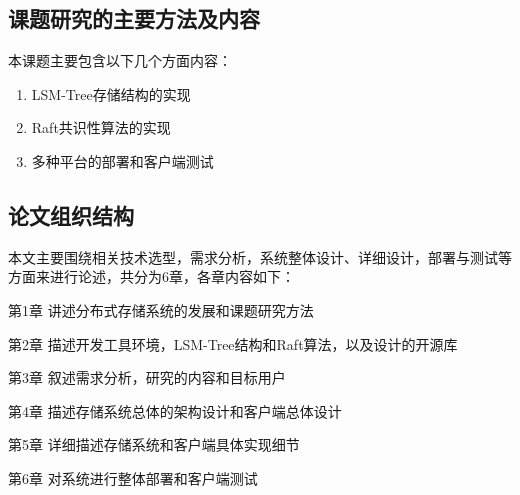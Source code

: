   	\subsection{课题研究的主要方法及内容}

  	本课题主要包含以下几个方面内容：
  
  	\begin{enumerate}
		\item LSM-Tree存储结构的实现
		\item Raft共识性算法的实现
		\item 多种平台的部署和客户端测试
  	\end{enumerate}

  	\subsection{论文组织结构}
  
  	本文主要围绕相关技术选型，需求分析，系统整体设计、详细设计，部署与测试等方面来进行论述，共分为6章，各章内容如下：
	
	第1章 讲述分布式存储系统的发展和课题研究方法
	
    第2章 描述开发工具环境，LSM-Tree结构和Raft算法，以及设计的开源库
    
    第3章 叙述需求分析，研究的内容和目标用户
    
    第4章 描述存储系统总体的架构设计和客户端总体设计
       
    第5章 详细描述存储系统和客户端具体实现细节
    
    第6章 对系统进行整体部署和客户端测试
    
    
\clearpage